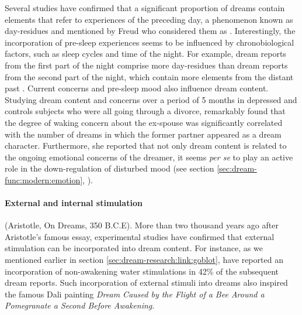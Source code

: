 Several studies \citep{botman_dream_1990, nielsen_day-residue_1992, marquardt_empirical_1996} have confirmed that a significant proportion of dreams contain elements that refer to experiences of the preceding day, a phenomenon known as day-residues and mentioned by Freud who considered them as  \citep{freud_interpretation_1900}. Interestingly, the incorporation of pre-sleep experiences seems to be influenced by chronobiological factors, such as sleep cycles and time of the night. For example, dream reports from the first part of the night comprise more day-residues than dream reports from the second part of the night, which contain more elements from the distant past \citep{roffwarg_effects_1978}.
Current concerns and pre-sleep mood also influence dream content. Studying dream content and concerns over a period of 5 months in depressed and controls subjects who were all going through a divorce, \citet{cartwright_relation_2006} remarkably found that the degree of waking concern about the ex-spouse was significantly correlated with the number of dreams in which the former partner appeared as a dream character. Furthermore, she reported that not only dream content is related to the ongoing emotional concerns of the dreamer, it seems \emph{per se} to play an active role in the down-regulation of disturbed mood (see section \ref{sec:dream-func:modern:emotion}, \citealp{cartwright_dreams_1991, cartwright_role_1998, cartwright_role_1998, cartwright_relation_2006}).

\paragraph{External and internal stimulation}

 (Aristotle, On Dreams, 350 B.C.E). More than two thousand years ago after Aristotle's famous essay, experimental studies have confirmed that external stimulation can be incorporated into dream content. For instance, as we mentioned earlier in section \ref{sec:dream-research:link:goblot}, \citet{dement_relation_1958} have reported an incorporation of non-awakening water stimulations in 42\% of the subsequent dream reports. Such incorporation of external stimuli into dreams also inspired the famous Dali painting \emph{Dream Caused by the Flight of a Bee Around a Pomegranate a Second Before Awakening}.
